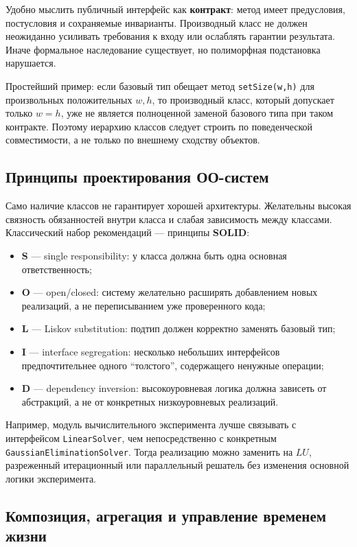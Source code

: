Удобно мыслить публичный интерфейс как \textbf{контракт}: метод имеет
предусловия, постусловия и сохраняемые инварианты. Производный класс не должен
неожиданно усиливать требования к входу или ослаблять гарантии результата.
Иначе формальное наследование существует, но полиморфная подстановка нарушается.

Простейший пример: если базовый тип обещает метод
\verb|setSize(w,h)| для произвольных положительных $w,h$, то производный класс,
который допускает только $w=h$, уже не является полноценной заменой базового
типа при таком контракте. Поэтому иерархию классов следует строить по
поведенческой совместимости, а не только по внешнему сходству объектов.

\subsection{Принципы проектирования ОО-систем}

Само наличие классов не гарантирует хорошей архитектуры. Желательны высокая
связность обязанностей внутри класса и слабая зависимость между классами.
Классический набор рекомендаций --- принципы \textbf{SOLID}:
\begin{itemize}
    \item \textbf{S} --- single responsibility: у класса должна быть одна
    основная ответственность;
    \item \textbf{O} --- open/closed: систему желательно расширять добавлением
    новых реализаций, а не переписыванием уже проверенного кода;
    \item \textbf{L} --- Liskov substitution: подтип должен корректно заменять
    базовый тип;
    \item \textbf{I} --- interface segregation: несколько небольших интерфейсов
    предпочтительнее одного ``толстого'', содержащего ненужные операции;
    \item \textbf{D} --- dependency inversion: высокоуровневая логика должна
    зависеть от абстракций, а не от конкретных низкоуровневых реализаций.
\end{itemize}

Например, модуль вычислительного эксперимента лучше связывать с интерфейсом
\verb|LinearSolver|, чем непосредственно с конкретным
\verb|GaussianEliminationSolver|. Тогда реализацию можно заменить на $LU$,
разреженный итерационный или параллельный решатель без изменения основной
логики эксперимента.

\subsection{Композиция, агрегация и управление временем жизни}

